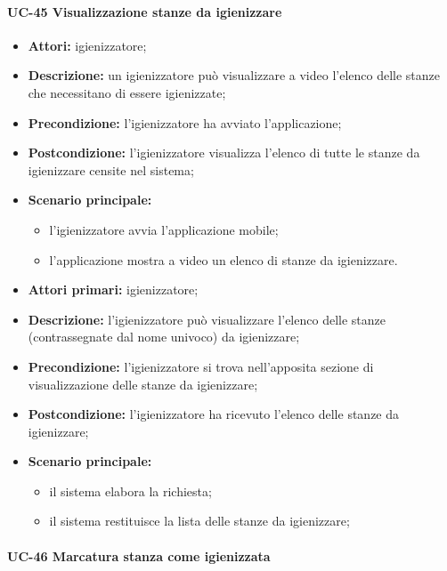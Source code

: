 \paragraph{UC-45 Visualizzazione stanze da igienizzare}
\begin{itemize}
    \item \textbf{Attori:} igienizzatore;
    \item \textbf{Descrizione:} un igienizzatore pu\`{o} visualizzare a video l'elenco delle stanze che necessitano di essere igienizzate;
    \item \textbf{Precondizione:} l'igienizzatore ha avviato l'applicazione;
    \item \textbf{Postcondizione:} l'igienizzatore visualizza l'elenco di tutte le stanze da igienizzare censite nel sistema;
    \item \textbf{Scenario principale:}
    \begin{itemize}
        \item l'igienizzatore avvia l'applicazione mobile;
        \item l'applicazione mostra a video un elenco di stanze da igienizzare.
    \end{itemize}
\end{itemize}

    \begin{itemize}
        \item \textbf{Attori primari:} igienizzatore;
        \item \textbf{Descrizione:} l’igienizzatore può visualizzare l'elenco delle stanze (contrassegnate dal nome univoco) da igienizzare;
        \item \textbf{Precondizione:} l'igienizzatore si trova nell’apposita sezione di visualizzazione delle stanze da igienizzare; 
        \item \textbf{Postcondizione:} l'igienizzatore ha ricevuto l'elenco delle stanze da igienizzare;
        \item \textbf{Scenario principale:} 
            \begin{itemize}
                \item il sistema elabora la richiesta;
                \item il sistema restituisce la lista delle stanze da igienizzare;
            \end{itemize}
    \end{itemize}
\paragraph{UC-46 Marcatura stanza come igienizzata}

